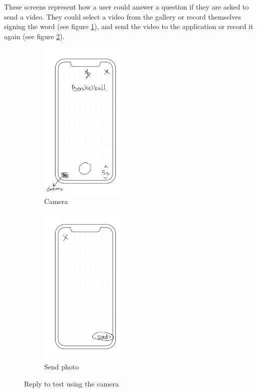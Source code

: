 These screens represent how a user could answer a question if they are asked to send a video. They could select a video from the gallery or record themselves signing the word (see figure \ref{fig:design_screen_camera}), and send the video to the application or record it again (see figure \ref{fig:design_screen_camera_send}). \\
\begin{figure}[H]
    \centering
    \begin{subfigure}[T]{0.49\textwidth}
        \centering
        \includegraphics[width=0.48\textwidth]{assets/screens/quiz/quiz-camera/Quiz - Camera.png}
        \caption{Camera}
        \label{fig:design_screen_camera}
    \end{subfigure}
    \hfill
    \begin{subfigure}[T]{0.49\textwidth}
        \centering
        \includegraphics[width=0.48\textwidth]{assets/screens/quiz/quiz-camera/Quiz - Camera send.png}
        \caption{Send photo}
        \label{fig:design_screen_camera_send}
    \end{subfigure}
       \caption{Reply to test using the camera}
       \label{fig:design_camera}
\end{figure}

